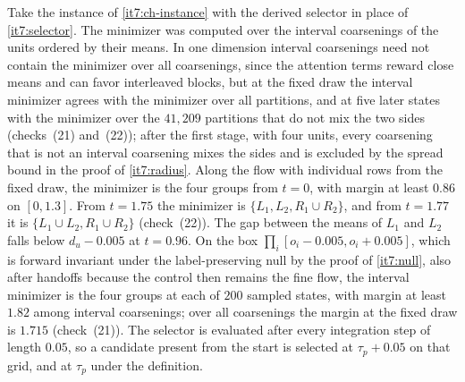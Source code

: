 \documentclass[11pt,letterpaper]{report}
\begin{document}
Take the instance of \cref{it7:ch-instance} with the derived selector in place of \cref{it7:selector}. The minimizer was computed over the interval coarsenings of the units ordered by their means. In one dimension interval coarsenings need not contain the minimizer over all coarsenings, since the attention terms reward close means and can favor interleaved blocks, but at the fixed draw the interval minimizer agrees with the minimizer over all partitions, and at five later states with the minimizer over the $41{,}209$ partitions that do not mix the two sides (checks~(21) and~(22)); after the first stage, with four units, every coarsening that is not an interval coarsening mixes the sides and is excluded by the spread bound in the proof of \cref{it7:radius}. Along the flow with individual rows from the fixed draw, the minimizer is the four groups from $t=0$, with margin at least $0.86$ on $[0,1.3]$. From $t=1.75$ the minimizer is $\{L_1,L_2,R_1\cup R_2\}$, and from $t=1.77$ it is $\{L_1\cup L_2,R_1\cup R_2\}$ (check~(22)). The gap between the means of $L_1$ and $L_2$ falls below $d_u-0.005$ at $t=0.96$. On the box $\prod_i[o_i-0.005,o_i+0.005]$, which is forward invariant under the label-preserving null by the proof of \cref{it7:null}, also after handoffs because the control then remains the fine flow, the interval minimizer is the four groups at each of $200$ sampled states, with margin at least $1.82$ among interval coarsenings; over all coarsenings the margin at the fixed draw is $1.715$ (check~(21)). The selector is evaluated after every integration step of length $0.05$, so a candidate present from the start is selected at $\tau_p+0.05$ on that grid, and at $\tau_p$ under the definition.
\end{document}
